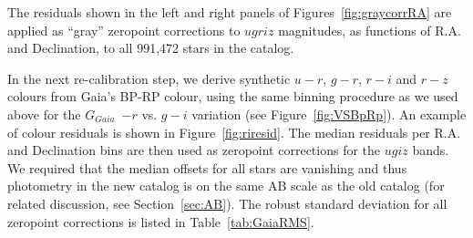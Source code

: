 \documentclass[fleqn,usenatbib]{mnras}
\newcommand{\GG}{\hbox{$G_{Gaia}$}}
\begin{document}
The residuals shown in the left and right panels of Figures~\ref{fig:graycorrRA} are
applied as ``gray'' zeropoint corrections to $ugriz$ magnitudes, as functions of 
R.A. and Declination, to all 991,472 stars in the catalog. 

In the next re-calibration step, we derive synthetic $u-r$, $g-r$, $r-i$ and $r-z$ colours
from Gaia's BP-RP colour, using the same binning procedure as we used above for 
the \GG~$-r$ vs. $g-i$ variation (see Figure~\ref{fig:VSBpRp}). An example of colour residuals 
is shown in Figure~\ref{fig:riresid}.  The median residuals per R.A. and Declination bins 
are then used as zeropoint corrections for the $ugiz$ bands. We required that the median
offsets for all stars are vanishing and thus photometry in the new catalog is on the 
same AB scale as the old catalog (for related discussion, see Section~\ref{sec:AB}). 
The robust standard deviation for all zeropoint corrections is listed in Table~\ref{tab:GaiaRMS}. 
\end{document}
